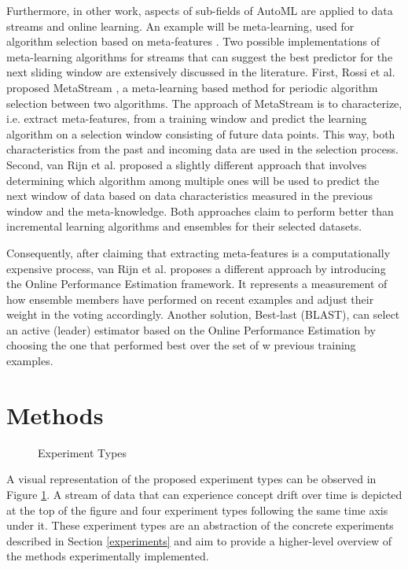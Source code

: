 \documentclass{sig-alternate-br}
\begin{document}
Furthermore, in other work, aspects of sub-fields of AutoML are applied to data streams and online learning. An example will be meta-learning, used for algorithm selection based on meta-features \cite{rossi2017guidance}. Two possible implementations of meta-learning algorithms for streams that can suggest the best predictor for the next sliding window are extensively discussed in the literature. First, Rossi et al. proposed MetaStream \cite{rossi2014metastream}, a meta-learning based method for periodic algorithm selection between two algorithms. The approach of MetaStream is to characterize, i.e. extract meta-features, from a training window and predict the learning algorithm on a selection window consisting of future data points. This way, both characteristics from the past and incoming data are used in the selection process. Second, van Rijn et al. \cite{van2014algorithm} proposed a slightly different approach that involves determining which algorithm among multiple ones will be used to predict the next window of data based on data characteristics measured in the previous window and the meta-knowledge. Both approaches claim to perform better than incremental learning algorithms and ensembles for their selected datasets.

Consequently, after claiming that extracting meta-features is a computationally expensive process, van Rijn et al. \cite{van2018online} proposes a different approach by introducing the Online Performance Estimation framework. It represents a measurement of how ensemble members have performed on recent examples and adjust their weight in the voting accordingly. Another solution, Best-last (BLAST), can select an active (leader) estimator based on the Online Performance Estimation by choosing the one that performed best over the set of w previous training examples.

\section{Methods}
\label{methods}

\begin{figure}
\centering 
{}
\caption{Experiment Types}
\label{fig:experiments}
\end{figure}

A visual representation of the proposed experiment types can be observed in Figure \ref{fig:experiments}. A stream of data that can experience concept drift over time is depicted at the top of the figure and four experiment types following the same time axis under it. These experiment types are an abstraction of the concrete experiments described in Section \ref{experiments} and aim to provide a higher-level overview of the methods experimentally implemented.
\end{document}
